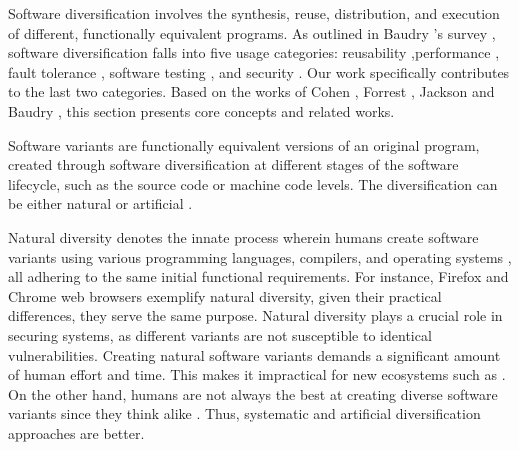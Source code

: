 

\label{sota:sw}

Software diversification involves the synthesis, reuse, distribution, and execution of different, functionally equivalent programs. 
As outlined in Baudry \etal's survey \cite{natural_diversity}, software diversification falls into five usage categories: reusability \cite{pohl2005software},performance \cite{10.1145/2025113.2025133}, fault tolerance \cite{1659219}, software testing \cite{Chen2010AdaptiveRT}, and security \cite{cohen1993operating}. 
Our work specifically contributes to the last two categories.
Based on the works of Cohen \etal \cite{cohen1993operating}, Forrest \etal \cite{595185}, Jackson \etal \cite{jackson} and Baudry \etal \cite{natural_diversity}, this section presents core concepts and related works. 

\label{generation}

Software variants are functionally equivalent versions of an original program, created through software diversification at different stages of the software lifecycle, such as the source code or machine code levels. 
The diversification can be either natural \cite{natural_diversity} or artificial \cite{offensive_div}.

\begin{strategy}
    \label{natural_diversity}
    Natural diversity denotes the innate process wherein humans create software variants using various programming languages, compilers, and operating systems \cite{natural_diversity}, all adhering to the same initial functional requirements.
    For instance, Firefox and Chrome web browsers exemplify natural diversity, given their practical differences, they serve the same purpose.
    Natural diversity plays a crucial role in securing systems, as different variants are not susceptible to identical vulnerabilities.
    Creating natural software variants demands a significant amount of human effort and time. 
    This makes it impractical for new ecosystems such as \Wasm.
    On the other hand, humans are not always the best at creating diverse software variants since they think alike \cite{feud}.
    Thus, systematic and artificial diversification approaches are better.
\end{strategy}


